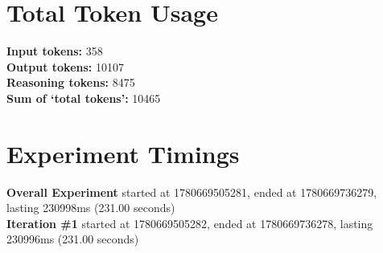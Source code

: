 \documentclass{article}
\begin{document}
\section*{Total Token Usage}
\textbf{Input tokens: }358
\\\textbf{Output tokens: }10107
\\\textbf{Reasoning tokens: }8475
\\\textbf{Sum of `total tokens': }10465
\section*{Experiment Timings}
\textbf{Overall Experiment} started at 1780669505281, ended at 1780669736279, lasting 230998ms (231.00 seconds)
\\\textbf{Iteration \#1} started at 1780669505282, ended at 1780669736278, lasting 230996ms (231.00 seconds)
\end{document}
